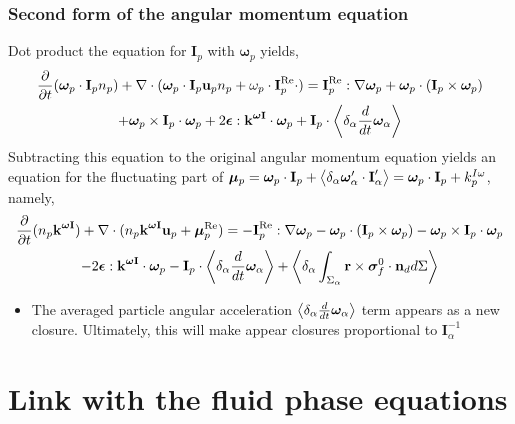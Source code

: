\documentclass{sintefbeamer}
\begin{document}
\begin{frame}
  \frametitle{Second form of the angular momentum equation}
Dot product the equation for $\textbf{I}_p$ with $\bm\omega_p$ yields, 
\begin{multline}
    \frac{\partial}{\partial t} (\bm\omega_p \cdot \textbf{I}_p n_p )+ \mathbf{\nabla}\cdot (\bm\omega_p\cdot \textbf{I}_p\textbf{u}_p  n_p + \omega_p\cdot \textbf{I}^\text{Re}_p\cdot )
    = 
    \textbf{I}_p^\text{Re} : \mathbf{\nabla}\bm\omega_p
    + \bm\omega_p\cdot(\textbf{I}_p \times \bm\omega_p) \\
    + \bm\omega_p \times \textbf{I}_p \cdot \bm\omega_p 
    + 2\bm\epsilon : \textbf{k}^{\bm\omega \textbf{I}}\cdot\bm\omega_p
    + \textbf{I}_p\cdot \left<\delta_\alpha \frac{d}{d t} \bm\omega_\alpha\right>
\end{multline}
  Subtracting this equation to the original angular momentum equation yields an equation for the fluctuating part of $\bm\mu_p = \bm\omega_p \cdot \textbf{I}_p + \left<\delta_\alpha \bm\omega_\alpha' \cdot \textbf{I}_\alpha'\right> = \bm\omega_p \cdot \textbf{I}_p + k^{I\omega}_p$, namely, 
\begin{multline*}
  \frac{\partial}{\partial t} (n_p \textbf{k}^{\bm\omega \textbf{I}})
  + \mathbf{\nabla}\cdot (n_p \textbf{k}^{\bm\omega \textbf{I}} \textbf{u}_p
  + \bm\mu_p^\text{Re})
  =
  - \textbf{I}_p^\text{Re} : \mathbf{\nabla}\bm\omega_p
  - \bm\omega_p\cdot(\textbf{I}_p \times \bm\omega_p) 
  - \bm\omega_p \times \textbf{I}_p \cdot \bm\omega_p \\
  - 2\bm\epsilon : \textbf{k}^{\bm\omega \textbf{I}}\cdot\bm\omega_p
  - \textbf{I}_p\cdot \left<\delta_\alpha \frac{d}{d t} \bm\omega_\alpha\right>
  + \left<\delta_\alpha \int_{\Sigma_\alpha}  \textbf{r}\times\bm{\sigma}_f^0\cdot \textbf{n}_d d\Sigma\right>
\end{multline*}

\begin{itemize}
  \item The averaged particle angular acceleration $\left<\delta_\alpha \frac{d}{d t} \bm\omega_\alpha\right>$ term appears as a new closure. 
  Ultimately, this will make appear closures proportional to $\textbf{I}_\alpha^{-1}$
\end{itemize}
\end{frame}

\section{Link with the fluid phase equations}
\section*{}
\end{document}
